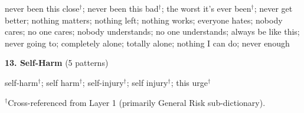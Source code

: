 \documentclass[review,12pt,authoryear]{elsarticle}
\begin{document}
\noindent\small never been this close$^\dagger$; never been this bad$^\dagger$; the worst it's ever been$^\dagger$; never get better; nothing matters; nothing left; nothing works; everyone hates; nobody cares; no one cares; nobody understands; no one understands; always be like this; never going to; completely alone; totally alone; nothing I can do; never enough

\bigskip

\noindent\normalsize\textbf{13. Self-Harm} (5 patterns)

\noindent\small self-harm$^\dagger$; self harm$^\dagger$; self-injury$^\dagger$; self injury$^\dagger$; this urge$^\dagger$

\bigskip

\noindent\normalsize $^\dagger$Cross-referenced from Layer 1 (primarily General Risk sub-dictionary).
\end{document}
